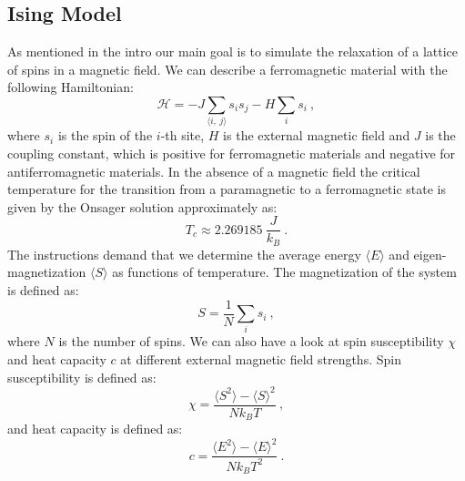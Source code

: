 \documentclass[10pt, titlepage, a4paper]{article}
\newcommand{\la}{\langle}
\newcommand{\ra}{\rangle}
\newcommand{\mc}[1]{\mathcal{#1}}
\begin{document}
\subsection{Ising Model}
As mentioned in the intro our main goal is to simulate the relaxation of a lattice of spins in a magnetic field. We can describe a
ferromagnetic material with the following Hamiltonian:
%
\begin{equation}
    \label{eq:ising-hamiltonian}
    \mc{H} = -J\sum_{\la i,\>j\ra}s_is_j - H\sum_is_i\>,
\end{equation}
%
where $s_i$ is the spin of the $i$-th site, $H$ is the external magnetic field and $J$ is the coupling constant, which is positive for
ferromagnetic materials and negative for antiferromagnetic materials. In the absence of a magnetic field the critical temperature for the 
transition from a paramagnetic to a ferromagnetic state is given by the Onsager solution approximately as:
%
\begin{equation}
    \label{eq:onsager}
    T_c \approx 2.269185\>\frac{J}{k_B}\>.
\end{equation}
%
The instructions demand that we determine the average energy $\la E\ra$ and eigen-magnetization $\la S\ra$ as functions of temperature. The
magnetization of the system is defined as:
%
\begin{equation}
    \label{eq:magnetization}
    S = \frac{1}{N}\sum_is_i\>,
\end{equation}
%
where $N$ is the number of spins. We can also have a look at spin susceptibility $\chi$ and heat capacity $c$ at different external magnetic
field strengths. Spin susceptibility is defined as:
%
\begin{equation}
    \label{eq:spin-susceptibility}
    \chi = \frac{\la S^2\ra - \la S\ra^2}{Nk_BT}\>,
\end{equation}
%
and heat capacity is defined as:
%
\begin{equation}
    \label{eq:heat-capacity}
    c = \frac{\la E^2\ra - \la E\ra^2}{Nk_BT^2}\>.
\end{equation}
\end{document}

